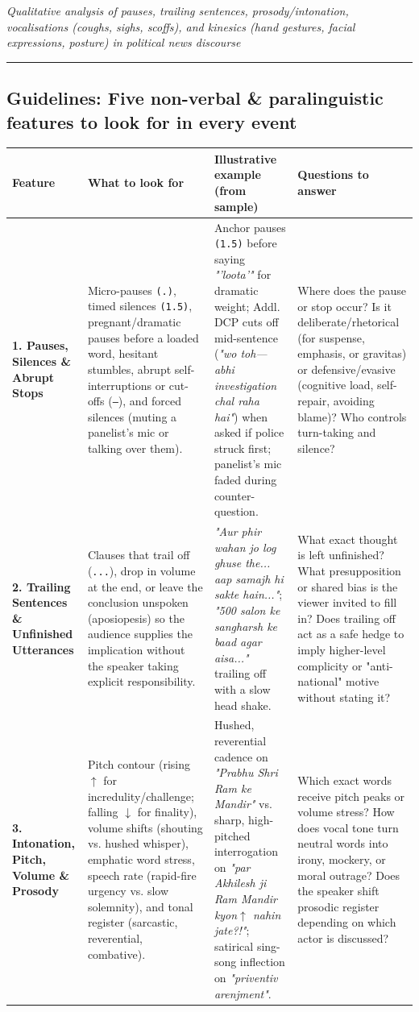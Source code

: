 \documentclass[10pt,a4paper]{article}
\begin{document}
\textit{Qualitative analysis of pauses, trailing sentences, prosody/intonation, vocalisations (coughs, sighs, scoffs), and kinesics (hand gestures, facial expressions, posture) in political news discourse}\par\smallskip

\bigskip\hrule\bigskip

\subsection*{Guidelines: Five non-verbal \& paralinguistic features to look for in every event}

\begin{longtable}{|p{}|p{}|p{}|p{}|}
\hline
Feature & What to look for & Illustrative example (from sample) & Questions to answer \\ \hline \endhead
\textbf{1. Pauses, Silences \& Abrupt Stops} & Micro-pauses \texttt{(.)}, timed silences \texttt{(1.5)}, pregnant/dramatic pauses before a loaded word, hesitant stumbles, abrupt self-interruptions or cut-offs (\texttt{---}), and forced silences (muting a panelist's mic or talking over them). & Anchor pauses \texttt{(1.5)} before saying \textit{"'loota'"} for dramatic weight; Addl. DCP cuts off mid-sentence (\textit{"wo toh--- abhi investigation chal raha hai"}) when asked if police struck first; panelist's mic faded during counter-question. & Where does the pause or stop occur? Is it deliberate/rhetorical (for suspense, emphasis, or gravitas) or defensive/evasive (cognitive load, self-repair, avoiding blame)? Who controls turn-taking and silence? \\ \hline
\textbf{2. Trailing Sentences \& Unfinished Utterances} & Clauses that trail off (\texttt{...}), drop in volume at the end, or leave the conclusion unspoken (aposiopesis) so the audience supplies the implication without the speaker taking explicit responsibility. & \textit{"Aur phir wahan jo log ghuse the... aap samajh hi sakte hain..."}; \textit{"500 salon ke sangharsh ke baad agar aisa..."} trailing off with a slow head shake. & What exact thought is left unfinished? What presupposition or shared bias is the viewer invited to fill in? Does trailing off act as a safe hedge to imply higher-level complicity or "anti-national" motive without stating it? \\ \hline
\textbf{3. Intonation, Pitch, Volume \& Prosody} & Pitch contour (rising \texttt{$\uparrow$} for incredulity/challenge; falling \texttt{$\downarrow$} for finality), volume shifts (shouting vs. hushed whisper), emphatic word stress, speech rate (rapid-fire urgency vs. slow solemnity), and tonal register (sarcastic, reverential, combative). & Hushed, reverential cadence on \textit{"Prabhu Shri Ram ke Mandir"} vs. sharp, high-pitched interrogation on \textit{"par Akhilesh ji Ram Mandir kyon$\uparrow$ nahin jate?!"}; satirical sing-song inflection on \textit{"priventiv arenjment"}. & Which exact words receive pitch peaks or volume stress? How does vocal tone turn neutral words into irony, mockery, or moral outrage? Does the speaker shift prosodic register depending on which actor is discussed? \\ \hline

\end{longtable}
\end{document}
